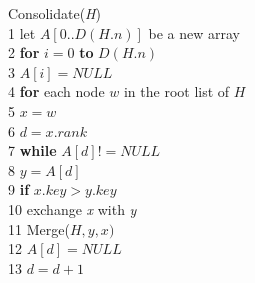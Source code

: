 \documentclass[12pt, a4paper]{article}
\begin{document}
	\large{Consolidate(\textit{H})} \\
	1\-\hspace{0.5cm} let $A[0..D(H.n)]$ be a new array \\
	2\-\hspace{0.5cm} \textbf{for} $i = 0$ \textbf{to} $D(H.n)$ \\
	3\-\hspace{0.5cm} \-\hspace{0.5cm} $A[i] = NULL$\\
	4\-\hspace{0.5cm} \textbf{for} each node $w$ in the root list of $H$\\
	5\-\hspace{0.5cm} \-\hspace{0.5cm} $x = w$\\
	6\-\hspace{0.5cm} \-\hspace{0.5cm} $d = x.rank$\\
	7\-\hspace{0.5cm} \-\hspace{0.5cm} \textbf{while} $A[d] != NULL$ \\
	8\-\hspace{0.5cm} \-\hspace{0.5cm} \-\hspace{0.5cm} $y = A[d]$ \\
	9\-\hspace{0.5cm} \-\hspace{0.5cm} \-\hspace{0.5cm} \textbf{if} $x.key > y.key$ \\
	10\-\hspace{0.5cm} \-\hspace{0.5cm} \-\hspace{0.5cm} \-\hspace{0.5cm} exchange \textit{x} with \textit{y} \\
	11\-\hspace{0.5cm} \-\hspace{0.5cm} \-\hspace{0.5cm} Merge($H, y, x)$ \\
	12\-\hspace{0.5cm} \-\hspace{0.5cm} \-\hspace{0.5cm} $A[d] = NULL$ \\
	13\-\hspace{0.5cm} \-\hspace{0.5cm} \-\hspace{0.5cm} $d = d + 1$ \\
\end{document}
